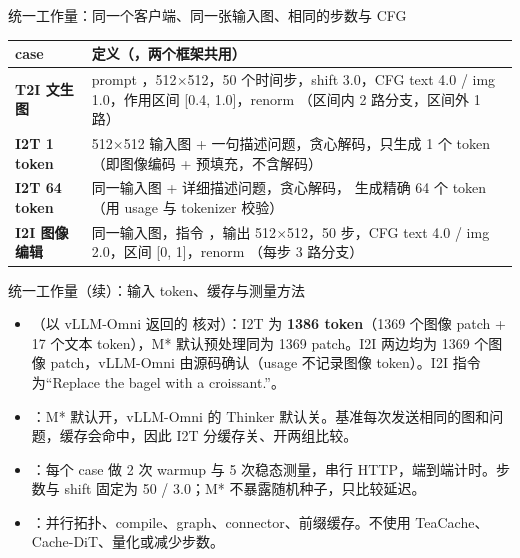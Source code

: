 \begin{frame}[t]{统一工作量：同一个客户端、同一张输入图、相同的步数与 CFG}
\scriptsize\def\codesize{\relax}
\renewcommand{\arraystretch}{1.15}
\begin{tabularx}{\textwidth}{>{\bfseries}p{2.0cm} Y}
\toprule
{}
case & 定义（，两个框架共用） \\
\midrule
T2I 文生图 & prompt ，512$\times$512，50 个时间步，shift 3.0，CFG text 4.0 / img 1.0，作用区间 [0.4, 1.0]，renorm （区间内 2 路分支，区间外 1 路） \\
I2T 1 token & 512$\times$512 输入图 + 一句描述问题，贪心解码，只生成 1 个 token（即图像编码 + 预填充，不含解码） \\
I2T 64 token & 同一输入图 + 详细描述问题，贪心解码， 生成精确 64 个 token（用 usage 与 tokenizer 校验） \\
I2I 图像编辑 & 同一输入图，指令 ，输出 512$\times$512，50 步，CFG text 4.0 / img 2.0，区间 [0, 1]，renorm （每步 3 路分支） \\
\bottomrule
\end{tabularx}
\vspace{6pt}
\end{frame}
\begin{frame}[t]{统一工作量（续）：输入 token、缓存与测量方法}
\small
\begin{itemize}\setlength\itemsep{3pt}
  \item {}（以 vLLM-Omni 返回的  核对）：I2T 为 \textbf{1386 token}（1369 个图像 patch + 17 个文本 token），M* 默认预处理同为 1369 patch。I2I 两边均为 1369 个图像 patch，vLLM-Omni 由源码确认（usage 不记录图像 token）。I2I 指令为“Replace the bagel with a croissant.”。
  \item {}：M* 默认开，vLLM-Omni 的 Thinker 默认关。基准每次发送相同的图和问题，缓存会命中，因此 I2T 分缓存关、开两组比较。
  \item {}：每个 case 做 2 次 warmup 与 5 次稳态测量，串行 HTTP，端到端计时。步数与 shift 固定为 50 / 3.0；M* 不暴露随机种子，只比较延迟。
  \item {}：并行拓扑、compile、graph、connector、前缀缓存。不使用 TeaCache、Cache-DiT、量化或减少步数。
\end{itemize}
\end{frame}
